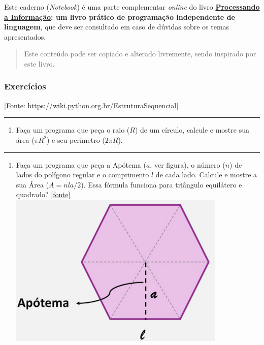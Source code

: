 \documentclass[12pt,a4paper]{article}
\renewcommand{\linethickness}{0.05em}
\providecommand{\tightlist}{%
      \setlength{\itemsep}{0pt}\setlength{\parskip}{0pt}}
\begin{document}
Este caderno (\emph{Notebook}) é uma parte complementar \emph{online} do
livro
\textbf{\href{https://editora.ufabc.edu.br/matematica-e-ciencias-da-computacao/58-processando-a-informacao}{Processando
a Informação}: um livro prático de programação independente de
linguagem}, que deve ser consultado em caso de dúvidas sobre os temas
apresentados.

\begin{quote}
Este conteúdo pode ser copiado e alterado livremente, sendo inspirado
por este livro.
\end{quote}

    \hypertarget{exercuxedcios}{%
\subsubsection{Exercícios}\label{exercuxedcios}}

{[}Fonte: https://wiki.python.org.br/EstruturaSequencial{]}

    \begin{center}\rule{0.5\linewidth}{\linethickness}\end{center}

\begin{enumerate}
\def\labelenumi{\arabic{enumi}.}
\tightlist
\item
  Faça um programa que peça o raio (\(R\)) de um círculo, calcule e
  mostre sua área (\(\pi R^2\)) e seu perímetro (\(2\pi R\)).
\end{enumerate}

    \begin{center}\rule{0.5\linewidth}{\linethickness}\end{center}

\begin{enumerate}
\def\labelenumi{\arabic{enumi}.}
\setcounter{enumi}{1}
\tightlist
\item
  Faça um programa que peça a Apótema (\(a\), ver figura), o número
  (\(n\)) de lados do polígono regular e o comprimento \(l\) de cada
  lado. Calcule e mostre a sua Área (\(A=nla/2\)). Essa fórmula funciona
  para triângulo equilátero e quadrado?
  {[}\href{https://www.todamateria.com.br/area-dos-poligonos/amp/}{fonte}{]}
  \includegraphics{"figs/poligono.png"}
\end{enumerate}
\end{document}
